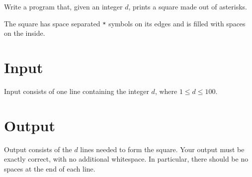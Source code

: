 
Write a program that, given an integer $d$, prints a square made out of asterisks.

The square has space separated \texttt{*} symbols on its edges and is filled with spaces on the inside.

\section*{Input}
Input consists of one line containing the integer $d$, where $1 \leq d \leq 100$.

\section*{Output}
Output consists of the $d$ lines needed to form the square.
Your output must be exactly correct, with no additional whitespace.
In particular, there should be no spaces at the end of each line.
